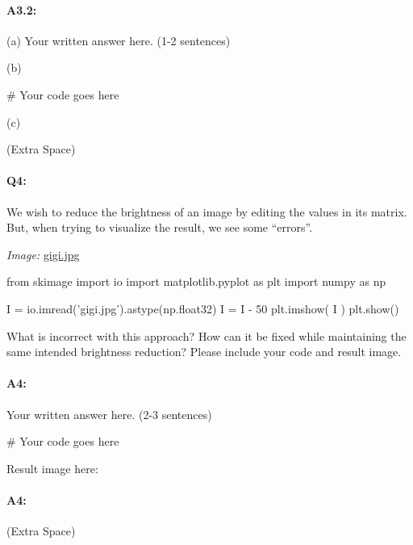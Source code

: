 \documentclass[11pt]{article}
\begin{document}
\paragraph{A3.2:} 

(a) Your written answer here. (1-2 sentences)

(b) 
\begin{python}
# Your code goes here
\end{python}

(c) 

 (Extra Space)



\pagebreak
\paragraph{Q4:} We wish to reduce the brightness of an image by editing the values in its matrix. But, when trying to visualize the result, we see some ``errors''.

\emph{Image:} \href{gigi.jpg}{gigi.jpg}

\begin{python}
from skimage import io
import matplotlib.pyplot as plt
import numpy as np

I =  io.imread('gigi.jpg').astype(np.float32)
I = I - 50
plt.imshow( I )
plt.show()
\end{python}

What is incorrect with this approach? How can it be fixed while maintaining the same intended brightness reduction? Please include your code and result image.

\paragraph{A4:} Your written answer here. (2-3 sentences)
\begin{python}
# Your code goes here
\end{python}

Result image here:

\pagebreak
\paragraph{A4:} (Extra Space)
\end{document}
